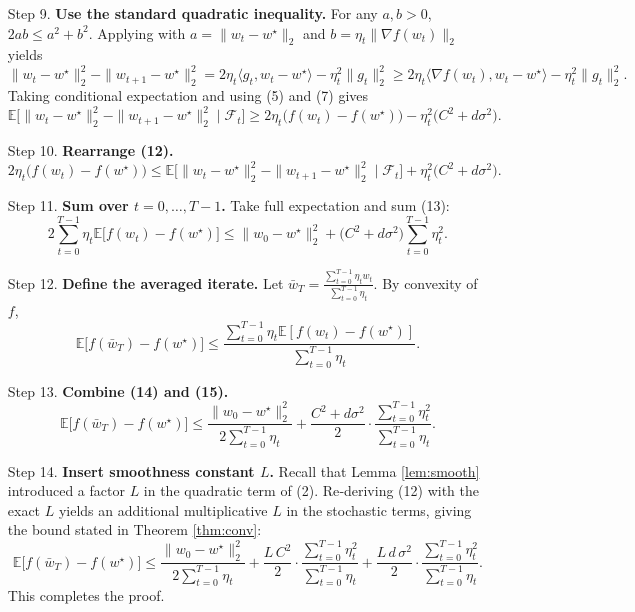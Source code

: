 \documentclass{article}
\begin{document}
\begin{enumerate}
\item[Step 9.] \textbf{Use the standard quadratic inequality.}  
For any $a,b>0$, $2ab\le a^{2}+b^{2}$. Applying with $a=\|w_t-w^{\star}\|_2$ and $b=\eta_t\|\nabla f(w_t)\|_2$ yields
\[
\|w_t-w^{\star}\|_2^{2}
-\|w_{t+1}-w^{\star}\|_2^{2}
=2\eta_t\langle g_t,w_t-w^{\star}\rangle-\eta_t^{2}\|g_t\|_2^{2}
\ge 2\eta_t\langle\nabla f(w_t),w_t-w^{\star}\rangle-\eta_t^{2}\|g_t\|_2^{2}.
\tag{11}
\]
Taking conditional expectation and using (5) and (7) gives
\[
\mathbb{E}\bigl[\|w_t-w^{\star}\|_2^{2}-\|w_{t+1}-w^{\star}\|_2^{2}\mid\mathcal{F}_t\bigr]
\ge 2\eta_t\bigl(f(w_t)-f(w^{\star})\bigr)-\eta_t^{2}\bigl(C^{2}+d\sigma^{2}\bigr).
\tag{12}
\]

\item[Step 10.] \textbf{Rearrange (12).}
\[
2\eta_t\bigl(f(w_t)-f(w^{\star})\bigr)
\le \mathbb{E}\bigl[\|w_t-w^{\star}\|_2^{2}-\|w_{t+1}-w^{\star}\|_2^{2}\mid\mathcal{F}_t\bigr]
+\eta_t^{2}\bigl(C^{2}+d\sigma^{2}\bigr).
\tag{13}
\]

\item[Step 11.] \textbf{Sum over $t=0,\dots,T-1$.}  
Take full expectation and sum (13):
\[
2\sum_{t=0}^{T-1}\eta_t\mathbb{E}\bigl[f(w_t)-f(w^{\star})\bigr]
\le \|w_0-w^{\star}\|_2^{2}
+\bigl(C^{2}+d\sigma^{2}\bigr)\sum_{t=0}^{T-1}\eta_t^{2}.
\tag{14}
\]

\item[Step 12.] \textbf{Define the averaged iterate.}  
Let $\bar w_T=\frac{\sum_{t=0}^{T-1}\eta_t w_t}{\sum_{t=0}^{T-1}\eta_t}$. By convexity of $f$,
\[
\mathbb{E}\bigl[f(\bar w_T)-f(w^{\star})\bigr]
\le\frac{\sum_{t=0}^{T-1}\eta_t\mathbb{E}[f(w_t)-f(w^{\star})]}{\sum_{t=0}^{T-1}\eta_t}.
\tag{15}
\]

\item[Step 13.] \textbf{Combine (14) and (15).}
\[
\mathbb{E}\bigl[f(\bar w_T)-f(w^{\star})\bigr]
\le
\frac{\|w_0-w^{\star}\|_2^{2}}{2\sum_{t=0}^{T-1}\eta_t}
+\frac{C^{2}+d\sigma^{2}}{2}\cdot\frac{\sum_{t=0}^{T-1}\eta_t^{2}}{\sum_{t=0}^{T-1}\eta_t}.
\tag{16}
\]

\item[Step 14.] \textbf{Insert smoothness constant $L$.}  
Recall that Lemma \ref{lem:smooth} introduced a factor $L$ in the quadratic term of (2). Re‑deriving (12) with the exact $L$ yields an additional multiplicative $L$ in the stochastic terms, giving the bound stated in Theorem \ref{thm:conv}:
\[
\mathbb{E}\bigl[f(\bar w_T)-f(w^{\star})\bigr]
\le
\frac{\|w_0-w^{\star}\|_2^{2}}{2\sum_{t=0}^{T-1}\eta_t}
+\frac{L\,C^{2}}{2}\cdot\frac{\sum_{t=0}^{T-1}\eta_t^{2}}{\sum_{t=0}^{T-1}\eta_t}
+\frac{L\,d\,\sigma^{2}}{2}\cdot\frac{\sum_{t=0}^{T-1}\eta_t^{2}}{\sum_{t=0}^{T-1}\eta_t}.
\tag{17}
\]
This completes the proof. \qedhere
\end{enumerate}
\end{document}
